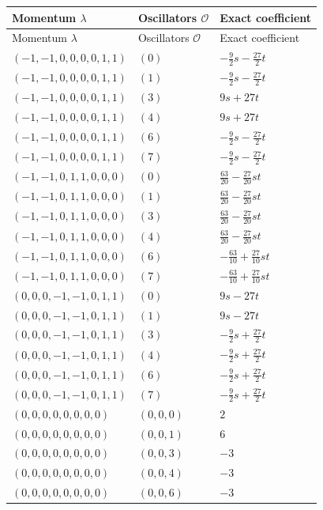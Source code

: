 \begingroup\scriptsize
\setlength{\tabcolsep}{5pt}
\begin{longtable}{@{}lll@{}}
\toprule
Momentum $\lambda$ & Oscillators $\mathcal O$ & Exact coefficient\\
\midrule\endfirsthead
\toprule
Momentum $\lambda$ & Oscillators $\mathcal O$ & Exact coefficient\\
\midrule\endhead
\bottomrule\endfoot
$(-1,-1,0,0,0,0,1,1)$ & $(0)$ & $-\frac{9}{2}s-\frac{27}{2}t$\\
$(-1,-1,0,0,0,0,1,1)$ & $(1)$ & $-\frac{9}{2}s-\frac{27}{2}t$\\
$(-1,-1,0,0,0,0,1,1)$ & $(3)$ & $9s+27t$\\
$(-1,-1,0,0,0,0,1,1)$ & $(4)$ & $9s+27t$\\
$(-1,-1,0,0,0,0,1,1)$ & $(6)$ & $-\frac{9}{2}s-\frac{27}{2}t$\\
$(-1,-1,0,0,0,0,1,1)$ & $(7)$ & $-\frac{9}{2}s-\frac{27}{2}t$\\
$(-1,-1,0,1,1,0,0,0)$ & $(0)$ & $\frac{63}{20}-\frac{27}{20}st$\\
$(-1,-1,0,1,1,0,0,0)$ & $(1)$ & $\frac{63}{20}-\frac{27}{20}st$\\
$(-1,-1,0,1,1,0,0,0)$ & $(3)$ & $\frac{63}{20}-\frac{27}{20}st$\\
$(-1,-1,0,1,1,0,0,0)$ & $(4)$ & $\frac{63}{20}-\frac{27}{20}st$\\
$(-1,-1,0,1,1,0,0,0)$ & $(6)$ & $-\frac{63}{10}+\frac{27}{10}st$\\
$(-1,-1,0,1,1,0,0,0)$ & $(7)$ & $-\frac{63}{10}+\frac{27}{10}st$\\
$(0,0,0,-1,-1,0,1,1)$ & $(0)$ & $9s-27t$\\
$(0,0,0,-1,-1,0,1,1)$ & $(1)$ & $9s-27t$\\
$(0,0,0,-1,-1,0,1,1)$ & $(3)$ & $-\frac{9}{2}s+\frac{27}{2}t$\\
$(0,0,0,-1,-1,0,1,1)$ & $(4)$ & $-\frac{9}{2}s+\frac{27}{2}t$\\
$(0,0,0,-1,-1,0,1,1)$ & $(6)$ & $-\frac{9}{2}s+\frac{27}{2}t$\\
$(0,0,0,-1,-1,0,1,1)$ & $(7)$ & $-\frac{9}{2}s+\frac{27}{2}t$\\
$(0,0,0,0,0,0,0,0)$ & $(0,0,0)$ & $2$\\
$(0,0,0,0,0,0,0,0)$ & $(0,0,1)$ & $6$\\
$(0,0,0,0,0,0,0,0)$ & $(0,0,3)$ & $-3$\\
$(0,0,0,0,0,0,0,0)$ & $(0,0,4)$ & $-3$\\
$(0,0,0,0,0,0,0,0)$ & $(0,0,6)$ & $-3$\\

\end{longtable}
